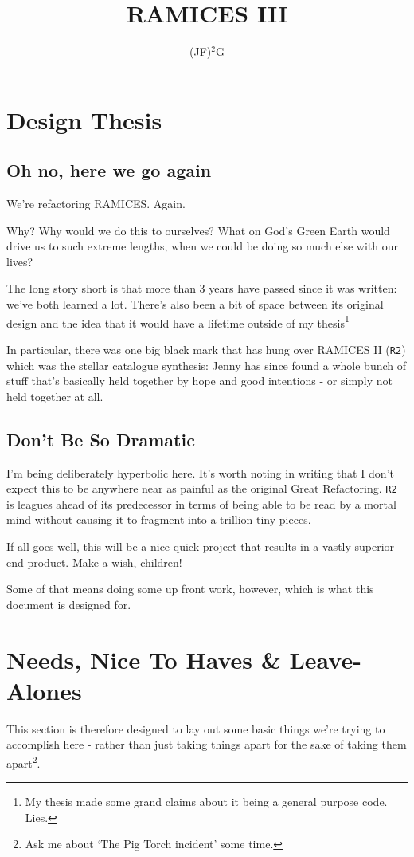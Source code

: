 \documentclass[a4paper,10pt]{article}
\title{RAMICES III}
\author{(JF)$^2$G}
\begin{document}
\maketitle
	\def\RTwo{\texttt{R2}}
	\newpage
	\section{Design Thesis}

		\subsection*{Oh no, here we go again}

			We're refactoring RAMICES. Again.

			Why? Why would we do this to ourselves? What on God's Green Earth would drive us to such extreme lengths, when we could be doing so much else with our lives?
			
			The long story short is that more than 3 years have passed since it was written: we've both learned a lot. There's also been a bit of space between its original design and the idea that it would have a lifetime outside of my thesis\footnote{My thesis made some grand claims about it being a general purpose code. Lies.}

			In particular, there was one big black mark that has hung over RAMICES II (\RTwo) which was the stellar catalogue synthesis: Jenny has since found a whole bunch of stuff that's basically held together by hope and good intentions - or simply not held together at all. 

			\subsection*{Don't Be So Dramatic}

				I'm being deliberately hyperbolic here. It's worth noting in writing that I don't expect this to be anywhere near as painful as the original Great Refactoring. \RTwo{} is leagues ahead of its predecessor in terms of being able to be read by a mortal mind without causing it to fragment into a trillion tiny pieces. 

				If all goes well, this will be a nice quick project that results in a vastly superior end product. Make a wish, children!

				Some of that means doing some up front work, however, which is what this document is designed for.

		\section*{Needs, Nice To Haves \& Leave-Alones}
			This section is therefore designed to lay out some basic things we're trying to accomplish
			here - rather than just taking things apart for the sake of taking them apart\footnote{Ask me about `The Pig Torch incident' some time.}.
		
\end{document}

